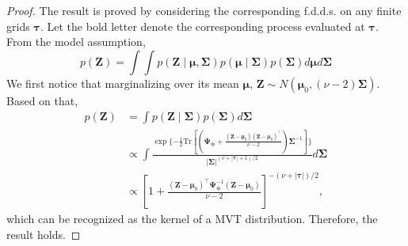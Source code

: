 \begin{proof}
The result is proved by considering the corresponding f.d.d.s. on any finite grids $\boldsymbol{\tau}$. Let the bold letter denote the corresponding process evaluated at $\boldsymbol{\tau}$. From the model assumption, 
\begin{equation}
    p(\mathbf{Z})=\int\int p(\mathbf{Z}\mid \boldsymbol{\mu},\boldsymbol{\Sigma})p(\boldsymbol{\mu}\mid \boldsymbol{\Sigma})p(\boldsymbol{\Sigma})d\boldsymbol{\mu}d\boldsymbol{\Sigma}
    \label{eq:marginalsignal}
\end{equation}
We first notice that marginalizing over its mean $\boldsymbol{\mu}$,  $\mathbf{Z}\sim N(\boldsymbol{\mu}_0,(\nu-2)\boldsymbol{\Sigma})$. Based on that, 
\begin{equation}
    \begin{split}
        p(\mathbf{Z})&=\int p(\mathbf{Z}\mid \boldsymbol{\Sigma})p(\boldsymbol{\Sigma})d\boldsymbol{\Sigma}\\
        &\propto \int \frac{\exp\{-\frac{1}{2}\text{Tr}[(\boldsymbol{\Psi}_{\boldsymbol{\phi}}+\frac{(\mathbf{Z}-\boldsymbol{\mu}_0)(\mathbf{Z}-\boldsymbol{\mu}_0)^{\top}}{\nu-2})\boldsymbol{\Sigma}^{-1}]\}}{|\boldsymbol{\Sigma}|^{(\nu+|\boldsymbol{\tau}|+1)/2}}d\boldsymbol{\Sigma}\\
        &\propto [1+\frac{(\mathbf{Z}-\boldsymbol{\mu}_0)^{\top}\boldsymbol{\Psi}_{\boldsymbol{\phi}}^{-1}(\mathbf{Z}-\boldsymbol{\mu}_0)}{\nu-2}]^{-(\nu+|\boldsymbol{\tau}|)/2},
   \end{split}
   \label{eq:marginalizescalematrix}
\end{equation}
which can be recognized as the kernel of a MVT distribution. Therefore, the result holds. 

\end{proof}

